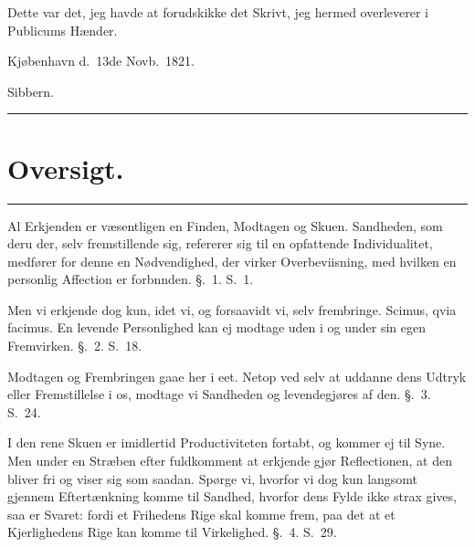 \documentclass[12pt,a4paper]{book}
\newcommand{\opage}[1]{\marginnote{\footnotesize\textit{[#1]}}}
\begin{document}
Dette var det, jeg havde at forudskikke det Skrivt, jeg hermed overleverer i
Publicums Hænder.

\begin{flushleft}
Kjøbenhavn d.\ 13de Novb.\ 1821.
\end{flushleft}
\begin{flushright}
Sibbern.
\end{flushright}

\begin{center}\rule{0.28\linewidth}{0.4pt}\end{center}

\chapter*{Oversigt.}

\begin{center}\rule{0.28\linewidth}{0.4pt}\end{center}

\opage{XIII} Al Erkjenden er væsentligen en Finden, Modtagen og Skuen. Sandheden, som deru
der,%
 selv fremstillende sig, refererer sig til en opfattende Individualitet,
medfører for denne en Nødvendighed, der virker Overbeviisning, med hvilken en
personlig Affection er forbnnden. §.~1. S.~1.

Men vi erkjende dog kun, idet vi, og forsaavidt vi, selv frembringe. Scimus,
qvia facimus. En levende Personlighed kan ej modtage uden i og under sin egen
Fremvirken. §.~2. S.~18.

Modtagen og Frembringen gaae her i eet. Netop ved selv at uddanne dens Udtryk
eller Fremstillelse i os, modtage vi Sandheden og levendegjøres af den.
§.~3. S.~24.

I den rene Skuen er imidlertid Productiviteten fortabt, og kommer ej til
Syne. Men under en Stræben efter fuldkomment at erkjende gjør Reflectionen,
at den bliver fri og viser sig som saadan. Spørge vi, hvorfor vi dog kun
langsomt gjennem Eftertænkning komme til Sandhed, hvorfor dens Fylde ikke
strax gives, saa er Svaret: fordi et Frihedens Rige skal komme frem, paa det
at et Kjerlighedens Rige kan komme til Virkelighed. §.~4. S.~29.
\end{document}

